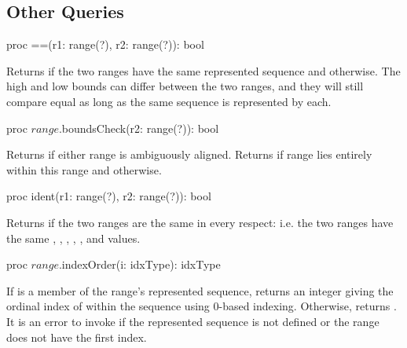 \subsection{Other Queries}
\label{Range_Queries}

\begin{protohead}
proc ==(r1: range(?), r2: range(?)): bool
\end{protohead}
\begin{protobody}
Returns  if the two ranges have the same represented sequence
and  otherwise.  The high and low bounds can differ between the two
ranges, and they will still compare equal as long as the same sequence is
represented by each.
\end{protobody}

\begin{protohead}
proc $range$.boundsCheck(r2: range(?)): bool
\end{protohead}
\begin{protobody}
Returns  if either range is ambiguously aligned.
Returns  if range  lies entirely within this range
and  otherwise.  
\end{protobody}

\begin{protohead}
proc ident(r1: range(?), r2: range(?)): bool
\end{protohead}
\begin{protobody}
Returns  if the two ranges are the same in every respect: i.e. the
two ranges have the same ,
, , , ,  and
 values.
\end{protobody}

\begin{protohead}
proc $range$.indexOrder(i: idxType): idxType
\end{protohead}
\begin{protobody}
If  is a member of the range's represented sequence, returns an integer giving
the ordinal index of  within the sequence using 0-based indexing.
Otherwise, returns .
It is an error to invoke  if the represented sequence
is not defined or the range does not have the first index.
\end{protobody}

